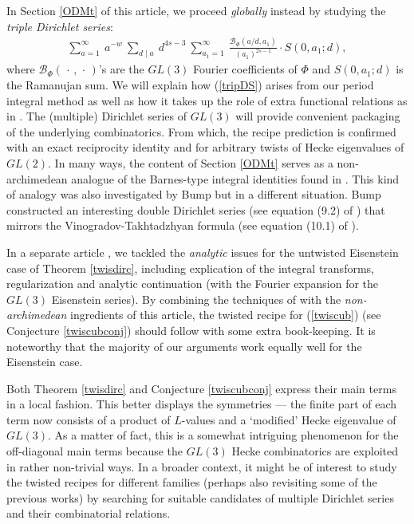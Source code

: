 \documentclass[11pt,reqno]{amsart}
\theoremstyle{definition}
\theoremstyle{definition}
\theoremstyle{remark}
\numberwithin{equation}{section}
\begin{document}
 In Section \ref{ODMt} of this article, we  proceed \textit{globally} instead by studying the  \textit{triple Dirichlet series}:
 \begin{align}\label{tripDS}
 	\sum_{a=1}^{\infty} \ a^{-w} \ \sum_{d \mid a} \  d^{4s-3} \
 	\sum_{a_{1}= 1}^{\infty}  \ \frac{\mathcal{B}_{\Phi}\left( a/d, a_{1}   \right)}{ (a_{1})^{2s-1}} \cdot S(0, a_{1};d),
 \end{align}
 where $\mathcal{B}_{\Phi}(\,\cdot\, , \, \cdot\, )$'s are the $GL(3)$ Fourier coefficients of $\Phi$ and $S(0, a_{1};d)$ is the Ramanujan sum.  We will explain how (\ref{tripDS}) arises from our period integral method as well as how it takes up  the role of  extra functional relations as in  \cite{HY10, CIS19, HN22,  BTB22+}.     The (multiple) Dirichlet series of $GL(3)$ will provide convenient packaging of  the underlying combinatorics. From which,   the recipe prediction is confirmed with an exact reciprocity identity and for arbitrary twists of Hecke eigenvalues of $GL(2)$.  In many ways,  the content of Section \ref{ODMt} serves as a non-archimedean analogue of the Barnes-type integral identities found in  \cite{Kw23a+}.  This kind of analogy was also investigated by Bump  \cite{Bu84} but in a different situation. Bump constructed an interesting double Dirichlet series  (see equation (9.2) of \cite{Bu84}) that mirrors  the Vinogradov-Takhtadzhyan  formula (see equation (10.1) of \cite{Bu84}).  


 In a separate article \cite{Kw23a+}, we  tackled the \textit{analytic} issues for the untwisted  Eisenstein case of Theorem \ref{twisdirc}, including explication of the integral transforms,  regularization and analytic continuation (with  the Fourier expansion for the  $GL(3)$ Eisenstein series).   By combining the techniques of \cite{Kw23a+} with the  \textit{non-archimedean}  ingredients of this article, 
 the twisted recipe for (\ref{twiscub})  (see Conjecture \ref{twiscubconj}) should follow with some extra book-keeping.  It is noteworthy that the majority of our arguments work equally well for the Eisenstein case. 
 
  Both Theorem \ref{twisdirc} and Conjecture \ref{twiscubconj} express their main terms  in a local fashion. This better displays the symmetries ---  the finite part of  each term now consists of a product of $L$-values and   a `modified' Hecke eigenvalue of $GL(3)$.  As a matter of fact, this is a somewhat intriguing phenomenon for the off-diagonal main terms because  the  $GL(3)$ Hecke combinatorics are exploited in rather non-trivial ways. In a broader context,  it might be of interest to study the  twisted recipes for different families (perhaps also revisiting some of the previous works) by  searching for  suitable candidates of  multiple Dirichlet series and their combinatorial relations. 
 
\end{document}
